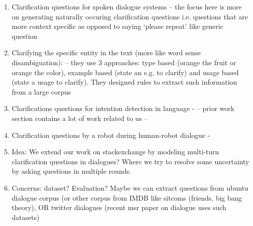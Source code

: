 \documentclass[11pt]{article}
\begin{document}
\begin{enumerate}
\item Clarification questions for spoken dialogue systems  -- the focus here is more on generating naturally occuring clarification questions i.e. questions that are more context specific as opposed to saying ‘please repeat’ like generic question %
\item Clarifying the specific entity in the text (more like word sense disambiguation): %
 -- they use 3 approaches: type based (orange the fruit or orange the color), example based (state an e.g. to clarify) and usage based (state a usage to clarify). They designed rules to extract such information from a large corpus
\item Clarifications questions for intention detection in language - %
--  prior work section contains a lot of work related to us -- 
\item Clarification questions by a robot during human-robot dialogue - %
\item Idea: We extend our work on stackexchange by modeling multi-turn clarification questions in dialogues? Where we try to resolve some uncertainty by asking questions in multiple rounds. 
\item Concerns: dataset? Evaluation? Maybe we can extract questions from ubuntu dialogue corpus (or other corpus from IMDB like sitcoms (friends, big bang theory), OR twitter dialogues (recent msr paper on dialogue uses such datasets)
\end{enumerate}
\end{document}
